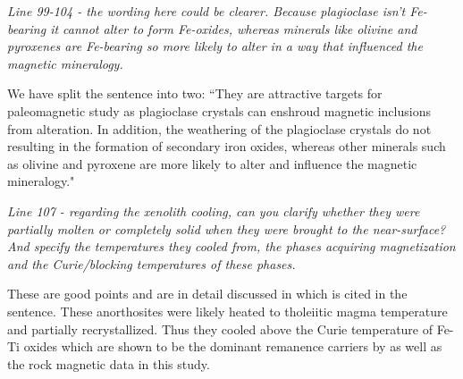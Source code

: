 \documentclass[11pt, letterpaper]{article}
\begin{document}
\begin{flushleft}
\textit{Line 99-104 - the wording here could be clearer. Because plagioclase isn't Fe-bearing it cannot alter to form Fe-oxides, whereas minerals like olivine and pyroxenes are Fe-bearing so more likely to alter in a way that influenced the magnetic mineralogy.}

We have split the sentence into two: ``They are attractive targets for paleomagnetic study as plagioclase crystals can enshroud magnetic inclusions from alteration. In addition, the weathering of the plagioclase crystals do not resulting in the formation of secondary iron oxides, whereas other minerals such as olivine and pyroxene are more likely to alter and influence the magnetic mineralogy."

\textit{Line 107 - regarding the xenolith cooling, can you clarify whether they were partially molten or completely solid when they were brought to the near-surface? And specify the temperatures they cooled from, the phases acquiring magnetization and the Curie/blocking temperatures of these phases.}

These are good points and are in detail discussed in \cite{Zhang2021b} which is cited in the sentence. These anorthosites were likely heated to tholeiitic magma temperature and partially recrystallized. Thus they cooled above the Curie temperature of Fe-Ti oxides which are shown to be the dominant remanence carriers by \cite{Zhang2021a} as well as the rock magnetic data in this study. 


\end{flushleft}
\end{document}
